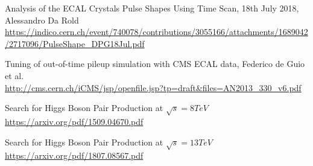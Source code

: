 \begin{thebibliography}{9999}
Analysis of the ECAL Crystals Pulse Shapes Using Time Scan, 18th July 2018, Alessandro Da Rold \\
\url{https://indico.cern.ch/event/740078/contributions/3055166/attachments/1689042/2717096/PulseShape_DPG18Jul.pdf}


Tuning of out-of-time pileup simulation with CMS ECAL
data, Federico de Guio et al. \\
\url{http://cms.cern.ch/iCMS/jsp/openfile.jsp?tp=draft&files=AN2013_330_v6.pdf}
 
Search for Higgs Boson Pair Production at $\sqrt{s} = 8TeV$ \\
\url{https://arxiv.org/pdf/1509.04670.pdf} 

Search for Higgs Boson Pair Production at $\sqrt{s} = 13TeV$ \\
\url{https://arxiv.org/pdf/1807.08567.pdf}

\end{thebibliography}